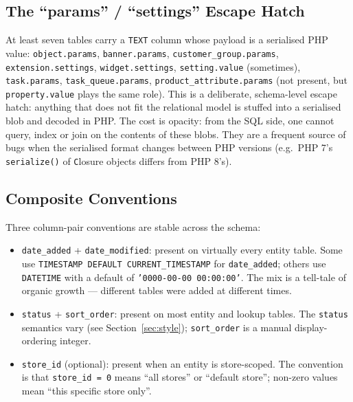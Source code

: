 \documentclass[11pt,a4paper]{article}
\begin{document}
\subsection{The ``params'' / ``settings'' Escape Hatch}

At least seven tables carry a \texttt{TEXT} column whose payload
is a serialised PHP value: \texttt{object.params},
\texttt{banner.params}, \texttt{customer\_group.params},
\texttt{extension.settings}, \texttt{widget.settings},
\texttt{setting.value} (sometimes), \texttt{task.params},
\texttt{task\_queue.params}, \texttt{product\_attribute.params}
(not present, but \texttt{property.value} plays the same role).
This is a deliberate, schema-level escape hatch: anything that
does not fit the relational model is stuffed into a
serialised blob and decoded in PHP. The cost is opacity: from
the SQL side, one cannot query, index or join on the contents
of these blobs. They are a frequent source of bugs when the
serialised format changes between PHP versions (e.g.\ PHP 7's
\texttt{serialize()} of \texttt{C}losure objects differs from
PHP 8's).

\subsection{Composite Conventions}

Three column-pair conventions are stable across the schema:

\begin{itemize}[leftmargin=1.6em,itemsep=2pt]
  \item \texttt{date\_added} + \texttt{date\_modified}: present on
        virtually every entity table. Some use \texttt{TIMESTAMP
        DEFAULT CURRENT\_TIMESTAMP} for \texttt{date\_added};
        others use \texttt{DATETIME} with a default of
        \texttt{'0000-00-00 00:00:00'}. The mix is a tell-tale
        of organic growth --- different tables were added at
        different times.
  \item \texttt{status} + \texttt{sort\_order}: present on most
        entity and lookup tables. The \texttt{status} semantics
        vary (see Section~\ref{sec:style}); \texttt{sort\_order}
        is a manual display-ordering integer.
  \item \texttt{store\_id} (optional): present when an entity is
        store-scoped. The convention is that \texttt{store\_id = 0}
        means ``all stores'' or ``default store''; non-zero values
        mean ``this specific store only''.
\end{itemize}
\end{document}
